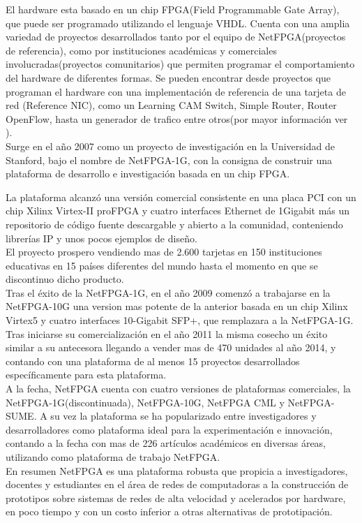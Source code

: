 El hardware esta basado en un chip FPGA(Field Programmable Gate Array), que puede ser programado  utilizando el lenguaje VHDL. Cuenta con una amplia variedad de proyectos desarrollados tanto por el equipo de NetFPGA(proyectos de referencia), como por instituciones académicas y comerciales involucradas(proyectos comunitarios) que permiten programar el comportamiento del hardware  de diferentes formas. Se pueden encontrar desde proyectos que programan el hardware con una implementación de referencia de una tarjeta de red (Reference NIC), como un Learning CAM Switch, Simple Router, Router OpenFlow, hasta un generador de trafico entre otros(por mayor informaci\'on ver \citep{NetFPGA2}).\\ 

Surge en el año 2007 como un proyecto de investigación en la Universidad de Stanford, bajo el nombre de NetFPGA-1G, con la consigna de construir una plataforma de desarrollo e investigación basada en un chip FPGA.
 
La plataforma alcanz\'o una versi\'on comercial consistente en una placa PCI con un chip Xilinx Virtex-II proFPGA y cuatro interfaces Ethernet de 1Gigabit m\'as un repositorio de código fuente descargable y abierto a la comunidad, conteniendo librerías IP y unos pocos ejemplos de diseño.\\

El proyecto prospero vendiendo mas de 2.600 tarjetas en 150 instituciones educativas en 15 países diferentes del mundo hasta el momento en que se discontinuo dicho producto.\\

Tras el éxito de la NetFPGA-1G, en el año 2009 comenzó a trabajarse en la NetFPGA-10G una version mas potente de la  anterior basada en un chip Xilinx Virtex5 y cuatro interfaces 10-Gigabit SFP+, que remplazara a la NetFPGA-1G. Tras iniciarse su comercialización en el año 2011 la misma cosecho un éxito similar a su antecesora llegando a vender mas de 470 unidades al año 2014, y contando con una plataforma de al menos 15 proyectos desarrollados específicamente para esta plataforma.\\

A la fecha, NetFPGA cuenta con cuatro versiones de plataformas comerciales, la NetFPGA-1G(discontinuada), NetFPGA-10G, NetFPGA CML y NetFPGA-SUME. A su vez la plataforma se ha popularizado entre investigadores y desarrolladores como plataforma ideal para la experimentación e innovación, contando a la fecha con mas de 226 artículos académicos\cite{NetFPGA4} en diversas áreas, utilizando como plataforma de trabajo NetFPGA.\\

En resumen NetFPGA es una plataforma robusta que propicia a investigadores, docentes y estudiantes en el área de redes de computadoras a la construcción de prototipos sobre sistemas de redes de alta velocidad y acelerados por hardware, en poco tiempo y con un costo inferior a otras alternativas de prototipaci\'on.



